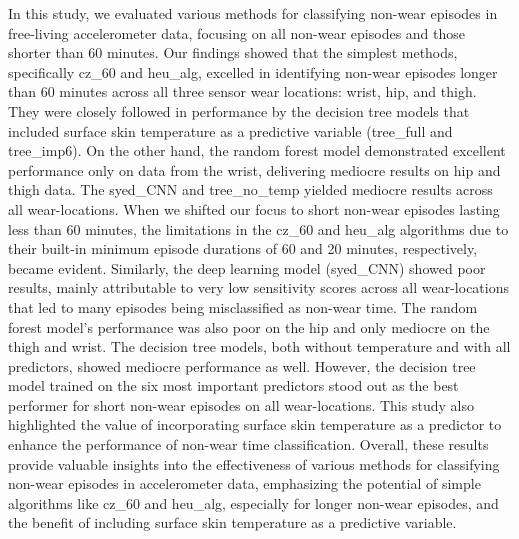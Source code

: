 \documentclass[
  10pt,
]{scrbook}
\begin{document}
In this study, we evaluated various methods for classifying non-wear
episodes in free-living accelerometer data, focusing on all non-wear
episodes and those shorter than 60 minutes. Our findings showed that the
simplest methods, specifically \textsf{cz\_60} and \textsf{heu\_alg},
excelled in identifying non-wear episodes longer than 60 minutes across
all three sensor wear locations: wrist, hip, and thigh. They were
closely followed in performance by the decision tree models that
included surface skin temperature as a predictive variable
(\textsf{tree\_full} and \textsf{tree\_imp6}). On the other hand, the
random forest model demonstrated excellent performance only on data from
the wrist, delivering mediocre results on hip and thigh data. The
\textsf{syed\_CNN} and \textsf{tree\_no\_temp} yielded mediocre results
across all wear-locations. When we shifted our focus to short non-wear
episodes lasting less than 60 minutes, the limitations in the
\textsf{cz\_60} and \textsf{heu\_alg} algorithms due to their built-in
minimum episode durations of 60 and 20 minutes, respectively, became
evident. Similarly, the deep learning model (\textsf{syed\_CNN}) showed
poor results, mainly attributable to very low sensitivity scores across
all wear-locations that led to many episodes being misclassified as
non-wear time. The random forest model's performance was also poor on
the hip and only mediocre on the thigh and wrist. The decision tree
models, both without temperature and with all predictors, showed
mediocre performance as well. However, the decision tree model trained
on the six most important predictors stood out as the best performer for
short non-wear episodes on all wear-locations. This study also
highlighted the value of incorporating surface skin temperature as a
predictor to enhance the performance of non-wear time classification.
Overall, these results provide valuable insights into the effectiveness
of various methods for classifying non-wear episodes in accelerometer
data, emphasizing the potential of simple algorithms like
\textsf{cz\_60} and \textsf{heu\_alg}, especially for longer non-wear
episodes, and the benefit of including surface skin temperature as a
predictive variable.
\end{document}
